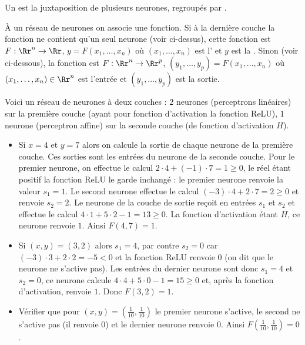 \documentclass[11pt,class=report,crop=false]{standalone}
\begin{document}
Un  est la juxtaposition de plusieurs neurones, regroupés par . 




\`A un réseau de neurones on associe une fonction.
Si à la dernière couche la fonction ne contient qu'un seul neurone (voir ci-dessus), cette fonction est  
$F : \Rr^n \to \Rr$, $y = F(x_1,\ldots,x_n)$ où $(x_1,\ldots,x_n)$ est l' et $y$ est la .
Sinon (voir ci-dessous), la fonction est  
$F : \Rr^n \to \Rr^p$, $(y_1,\ldots,y_p) = F(x_1,\ldots,x_n)$ où $(x_1,\ldots,x_n) \in \Rr^n$ est l'entrée et $(y_1,\ldots,y_p)$ est la sortie.



\begin{exemple}
Voici un réseau de neurones à deux couches : $2$ neurones (perceptrons linéaires) sur la première couche (ayant pour fonction d'activation la fonction ReLU), $1$ neurone (perceptron affine) sur la seconde couche  (de fonction d'activation $H$).




\begin{itemize}
  \item Si $x=4$ et $y=7$ alors on calcule la sortie de chaque neurone de la première couche. Ces sorties sont les entrées du neurone de la seconde couche.
  Pour le premier neurone, on effectue le calcul $2\cdot4+(-1)\cdot7 = 1 \ge0$, le réel étant positif la fonction ReLU le garde inchangé : le premier neurone renvoie la valeur $s_1=1$. Le second neurone effectue le calcul $(-3)\cdot4+2\cdot7 = 2 \ge0$ et renvoie $s_2=2$.
  Le neurone de la couche de sortie reçoit en entrées $s_1$ et $s_2$ et effectue le calcul $4\cdot 1+5\cdot 2-1 = 13\ge0$. La fonction d'activation étant $H$, ce neurone renvoie $1$.  
  Ainsi $F(4,7)=1$.
  
  
  
  \item Si $(x,y)=(3,2)$ alors $s_1=4$, par contre $s_2=0$ car $(-3)\cdot3+2\cdot2 = -5 <0$ et la fonction ReLU renvoie $0$ (on dit que le neurone ne s'active pas). Les entrées du dernier neurone sont donc $s_1=4$ et $s_2=0$, ce neurone calcule $4\cdot 4 + 5\cdot0-1=15\ge0$ et, après la fonction d'activation, renvoie $1$. 
  Donc $F(3,2)=1$.
  
  \item Vérifier que pour $(x,y)=(\frac1{10},\frac1{10})$ le premier neurone s'active, le second ne s'active pas (il renvoie $0$) et le dernier neurone renvoie $0$. Ainsi $F(\frac1{10},\frac1{10})=0$.
\end{itemize}
\end{exemple}
\end{document}
